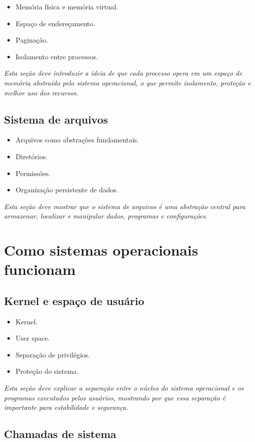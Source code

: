 \documentclass[12pt,openany]{book}
\newcommand{\placeholder}[1]{
    \par\medskip
    \noindent\textit{#1}
    \par\medskip
}
\newcommand{\topicos}[1]{
    \begin{itemize}
        #1
    \end{itemize}
}
\begin{document}
\begin{refsection}
\topicos{
    \item Memória física e memória virtual.
    \item Espaço de endereçamento.
    \item Paginação.
    \item Isolamento entre processos.
}

\placeholder{Esta seção deve introduzir a ideia de que cada processo opera em um espaço de memória abstraído pelo sistema operacional, o que permite isolamento, proteção e melhor uso dos recursos.}

\section{Sistema de arquivos}

\topicos{
    \item Arquivos como abstrações fundamentais.
    \item Diretórios.
    \item Permissões.
    \item Organização persistente de dados.
}

\placeholder{Esta seção deve mostrar que o sistema de arquivos é uma abstração central para armazenar, localizar e manipular dados, programas e configurações.}

\chapter{Como sistemas operacionais funcionam}

\section{Kernel e espaço de usuário}

\topicos{
    \item Kernel.
    \item User space.
    \item Separação de privilégios.
    \item Proteção do sistema.
}

\placeholder{Esta seção deve explicar a separação entre o núcleo do sistema operacional e os programas executados pelos usuários, mostrando por que essa separação é importante para estabilidade e segurança.}

\section{Chamadas de sistema}


\end{refsection}
\end{document}
